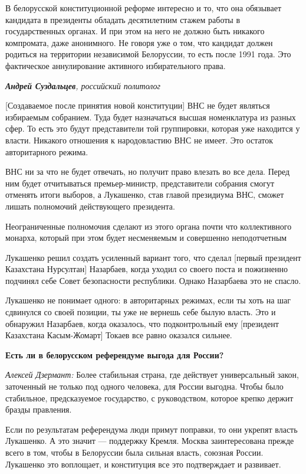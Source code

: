 В белорусской конституционной реформе интересно и то, что она обязывает кандидата в президенты обладать десятилетним стажем работы в государственных органах. И при этом на него не должно быть никакого компромата, даже анонимного. Не говоря уже о том, что кандидат должен родиться на территории независимой Белоруссии, то есть после 1991 года. Это фактическое аннулирование активного избирательного права.

\textit{\textbf{Андрей Суздальцев}, российский политолог}

[Создаваемое после принятия новой конституции] ВНС не будет являться избираемым собранием. Туда будет назначаться высшая номенклатура из разных сфер. То есть это будут представители той группировки, которая уже находится у власти. Никакого отношения к народовластию ВНС не имеет. Это остаток авторитарного режима.

ВНС ни за что не будет отвечать, но получит право влезать во все дела. Перед ним будет отчитываться премьер-министр, представители собрания смогут отменять итоги выборов, а Лукашенко, став главой президиума ВНС, сможет лишать полномочий действующего президента.

\begin{fancyquotes}
    Неограниченные полномочия сделают из этого органа почти что коллективного монарха, который при этом будет несменяемым и совершенно неподотчетным
\end{fancyquotes}

Лукашенко решил создать усиленный вариант того, что сделал [первый президент Казахстана Нурсултан] Назарбаев, когда уходил со своего поста и пожизненно подчинял себе Совет безопасности республики. Однако Назарбаева это не спасло.

Лукашенко не понимает одного: в авторитарных режимах, если ты хоть на шаг сдвинулся со своей позиции, ты уже не вернешь себе былую власть. Это и обнаружил Назарбаев, когда оказалось, что подконтрольный ему [президент Казахстана Касым-Жомарт] Токаев все равно оказался сильнее.

\textbf{Есть ли в белорусском референдуме выгода для России?}

\textit{Алексей Дзермант:} Более стабильная страна, где действует универсальный закон, заточенный не только под одного человека, для России выгодна. Чтобы было стабильное, предсказуемое государство, с руководством, которое крепко держит бразды правления.

Если по результатам референдума люди примут поправки, то они укрепят власть Лукашенко. А это значит — поддержку Кремля. Москва заинтересована прежде всего в том, чтобы в Белоруссии была сильная власть, союзная России. Лукашенко это воплощает, и конституция все это подтверждает и развивает.

